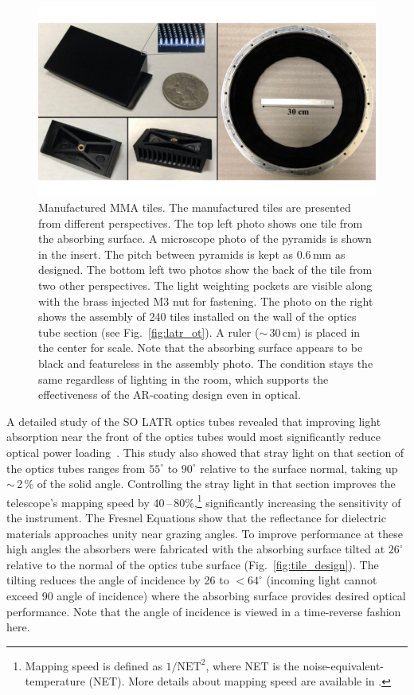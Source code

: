\begin{figure}
    \centering
    \includegraphics[width = .9\textwidth]{Figures/real_tile.pdf}
    \caption{Manufactured MMA tiles. The manufactured tiles are presented from different perspectives. The top left photo shows one tile from the absorbing surface. A microscope photo of the pyramids is shown in the insert. The pitch between pyramids is kept as 0.6\,mm as designed. The bottom left two photos show the back of the tile from two other perspectives. The light weighting pockets are visible along with the brass injected M3 nut for fastening. The photo on the right shows the assembly of 240 tiles installed on the wall of the optics tube section (see Fig.~\ref{fig:latr_ot}). A ruler ($\sim$\,30\,cm) is placed in the center for scale. Note that the absorbing surface appears to be black and featureless in the assembly photo. The condition stays the same regardless of lighting in the room, which supports the effectiveness of the AR-coating design even in optical.}
    \label{fig:real_tile}
\end{figure}

A detailed study of the SO LATR optics tubes revealed that improving light absorption near the front of the optics tubes would most significantly reduce optical power loading~\cite{gudmundsson/etal:2020}. This study also showed that stray light on that section of the optics tubes ranges from $55^\circ$ to $90^\circ$ relative to the surface normal, taking up $\sim$\,2\,\% of the solid angle. Controlling the stray light in that section improves the telescope's mapping speed by 40\,--\,80\%,\footnote{Mapping speed is defined as $1/\textrm{NET}^2$, where NET is the noise-equivalent-temperature (NET). More details about mapping speed are available in \cite{hill/etal:2018}.} significantly increasing the sensitivity of the instrument. The Fresnel Equations show that the reflectance for dielectric materials approaches unity near grazing angles.  To improve performance at these high angles the absorbers were fabricated with the absorbing surface tilted at $26^\circ$ relative to the normal of the optics tube surface (Fig.~\ref{fig:tile_design}). The tilting reduces the angle of incidence by 26\dg{} to $<64^\circ$ (incoming light cannot exceed 90\dg{} angle of incidence) where the absorbing surface provides desired optical performance. Note that the angle of incidence is viewed in a time-reverse fashion here.

